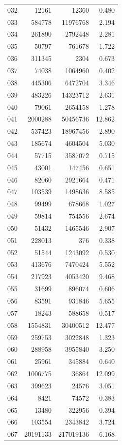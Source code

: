 \documentclass[anonymous,notoc]{gmcm2026}
\begin{document}
\begin{longtable}{lrrr}
032 & 12161 & 12360 & 0.480 \\
033 & 584778 & 11976768 & 2.194 \\
034 & 261890 & 2792448 & 2.281 \\
035 & 50797 & 761678 & 1.722 \\
036 & 311345 & 2304 & 0.673 \\
037 & 74038 & 1064960 & 0.402 \\
038 & 445306 & 6472704 & 3.346 \\
039 & 483226 & 14323712 & 2.631 \\
040 & 79061 & 2654158 & 1.278 \\
041 & 2000288 & 50456736 & 12.862 \\
042 & 537423 & 18967456 & 2.890 \\
043 & 185674 & 4604504 & 5.030 \\
044 & 57715 & 3587072 & 0.715 \\
045 & 43001 & 147456 & 0.651 \\
046 & 82060 & 2921664 & 0.471 \\
047 & 103539 & 1498636 & 8.585 \\
048 & 99499 & 678668 & 1.027 \\
049 & 59814 & 754556 & 2.674 \\
050 & 51432 & 1465546 & 2.907 \\
051 & 228013 & 376 & 0.338 \\
052 & 51544 & 1243092 & 0.530 \\
053 & 413676 & 7470424 & 5.552 \\
054 & 217923 & 4053420 & 9.468 \\
055 & 31699 & 896074 & 0.606 \\
056 & 83591 & 931846 & 5.655 \\
057 & 18243 & 588658 & 0.517 \\
058 & 1554831 & 30400512 & 12.477 \\
059 & 259753 & 3022848 & 1.323 \\
060 & 288958 & 3955840 & 3.250 \\
061 & 25961 & 345884 & 0.640 \\
062 & 1006775 & 36864 & 12.099 \\
063 & 399623 & 24576 & 3.051 \\
064 & 8421 & 74572 & 0.383 \\
065 & 13480 & 322956 & 0.394 \\
066 & 103554 & 2343842 & 3.724 \\
067 & 20191133 & 217019136 & 6.168 \\

\end{longtable}
\end{document}
